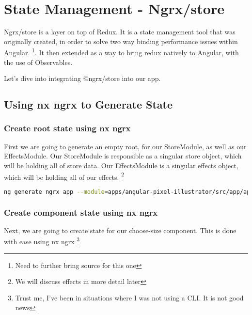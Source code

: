\maketitle{}
\section{ State Management - Ngrx/store }

Ngrx/store is a layer on top of Redux. It is a state management tool that was
originally created, in order to solve two way binding performance issues within
Angular. \footnote{Need to further bring source for this one}. It then extended
as a way to bring redux natively to Angular, with the use of Observables.

Let's dive into integrating @ngrx/store into our app. 

\subsection{ Using nx ngrx to Generate State }

\subsubsection{ Create root state using nx ngrx }

First we are going to generate an empty root, for our StoreModule, as well as
our EffectsModule. Our StoreModule is responsible as a singular store object,
which will be holding all of store data. Our EffectsModule is a singular effects
object, which will be holding all of our effects. \footnote{We will discuss
effects in more detail later}

\begin{lstlisting}[language=Bash]
ng generate ngrx app --module=apps/angular-pixel-illustrator/src/app/app.module.ts --onlyEmptyRoot
\end{lstlisting}

\subsubsection{ Create component state using nx ngrx }

Next, we are going to create state for our choose-size component. This is done
with ease using nx ngrx \footnote{Trust me, I've been in situations where I
was not using a CLI. It is not good news}


